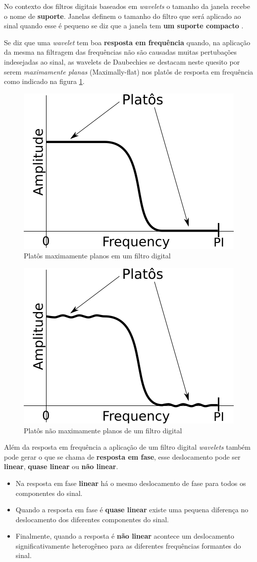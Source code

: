 \documentclass[a4paper,12pt,openright,oneside]{book}
\newenvironment{myenv}[1]
  {\begin{spacing}{#1}}
  {\end{spacing}}
\begin{document}
\begin{myenv}{1.5}
					\par No contexto dos filtros digitais baseados em \textit{wavelets} o tamanho da janela recebe o nome de \textbf{suporte}. Janelas definem o tamanho do filtro que será aplicado ao sinal quando esse é pequeno se diz que a janela tem \textbf{um suporte compacto} \cite{robi2003}.
				
					\par Se diz que uma \textit{wavelet} tem boa \textbf{resposta em frequência} quando, na aplicação da mesma na filtragem das frequências não são causadas muitas pertubações indesejadas ao sinal, as wavelets de Daubechies se destacam neste quesito por serem \textit{maximamente planas} (Maximally-flat) nos platôs de resposta em frequência como indicado na figura \ref{fig:daubechies}.

					\begin{figure}[h]
						\centering
						\includegraphics[width=0.3\linewidth]{images/daubechies}
						\caption{Platôs maximamente planos em um filtro digital}
						\label{fig:daubechies}
					\end{figure}

					\begin{figure}[h]
						\centering
						\includegraphics[width=0.3\linewidth]{images/noMaximallyFlat}
						\caption{Platôs não maximamente planos de um filtro digital}
						\label{fig:nomaximallyflat}
					\end{figure}
				
					\par Além da resposta em frequência a aplicação de um filtro digital \textit{wavelets} também pode gerar o que se chama de \textbf{resposta em fase}, esse deslocamento pode ser \textbf{linear}, \textbf{quase linear} ou \textbf{não linear}. 
					
					\begin{itemize}
						\item Na resposta em fase \textbf{linear} há o mesmo deslocamento de fase para todos os componentes do sinal.
						\item Quando a resposta em fase é \textbf{quase linear} existe uma pequena diferença no deslocamento dos diferentes componentes do sinal.
						\item Finalmente, quando a resposta é \textbf{não linear} acontece um deslocamento significativamente heterogêneo para as diferentes frequências formantes do sinal.
 					\end{itemize}
					

\end{myenv}
\end{document}

